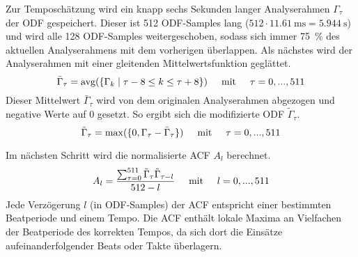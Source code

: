 {{{			%
			Zur Temposchätzung wird ein knapp sechs Sekunden langer Analyserahmen $\Gamma_\tau$ der \ac{ODF} gespeichert.
			Dieser ist \num{512} \ac{ODF}-Samples lang ($512 \cdot \SI{11.61}{\milli\second} = \SI{5.944}{\second} $)
				und wird alle \num{128} \ac{ODF}-Samples weitergeschoben,
				sodass sich immer \SI{75}{\percent} des aktuellen Analyserahmens mit dem vorherigen überlappen.
			Als nächstes wird der Analyserahmen mit einer gleitenden Mittelwertsfunktion geglättet.
			\begin{equation}
				\bar{\Gamma}_\tau = \text{avg}(\{\Gamma_k \mid \tau - 8 \leq k \leq \tau + 8 \})
				\text{\hspace{5mm}mit\hspace{5mm}} \tau = 0, ..., 511
			\end{equation}
			Dieser Mittelwert $\bar{\Gamma}_\tau$ wird von dem originalen Analyserahmen abgezogen und negative Werte auf \num{0} gesetzt.
			So ergibt sich die modifizierte \ac{ODF} $\tilde{\Gamma}_\tau$.
			\begin{equation}
				\tilde{\Gamma}_\tau = \max(\{0, \Gamma_\tau - \bar{\Gamma}_\tau\})
				\text{\hspace{5mm}mit\hspace{5mm}} \tau = 0, ..., 511
			\end{equation}

			Im nächsten Schritt wird die normalisierte \ac{ACF} $A_l$ berechnet.
			\begin{equation}
				A_l = \frac{\sum_{\tau = 0}^{511} \tilde{\Gamma}_\tau \tilde{\Gamma}_{\tau - l}}{512 - l}
				\text{\hspace{5mm}mit\hspace{5mm}} l = 0, ..., 511
			\end{equation}
			Jede Verzögerung $l$ (in \ac{ODF}-Samples) der \ac{ACF} entspricht einer bestimmten Beatperiode und einem Tempo.
			Die \ac{ACF} enthält lokale Maxima an Vielfachen der Beatperiode des korrekten Tempos,
				da sich dort die Einsätze aufeinanderfolgender Beats oder Takte überlagern.

}}}
